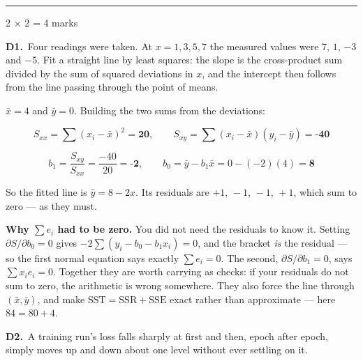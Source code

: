 \documentclass[10pt,a4paper]{article}
\newcommand{\parthead}[2]{\vspace{2pt}\noindent\rule{\linewidth}{0.4pt}\par\vspace{2pt}%
  \noindent{\bfseries Part #1}\hfill{\small #2}\par\vspace{1pt}}
\newcommand{\sol}[1]{\textbf{#1}}
\begin{document}
\newpage

\parthead{D --- Short answer}{2 $\times$ 2 = 4 marks}

\textbf{D1.}\ Four readings were taken. At $x = 1, 3, 5, 7$ the measured values were $7$, $1$, $-3$ and $-5$. Fit a straight line by least squares: the slope is the cross-product sum divided by the sum of squared deviations in $x$, and the intercept then follows from the line passing through the point of means.

\vspace{2pt}

$\bar x = 4$ and $\bar y = 0$. Building the two sums from the deviations:

\[ S_{xx} = \sum (x_i-\bar x)^2 = \sol{20}, \qquad S_{xy} = \sum (x_i-\bar x)(y_i-\bar y) = \sol{-40} \]

\[ b_1 = \frac{S_{xy}}{S_{xx}} = \frac{-40}{20} = \sol{-2}, \qquad b_0 = \bar y - b_1\bar x = 0 - (-2)(4) = \sol{8} \]

So the fitted line is $\hat y = 8 - 2 x$. Its residuals are $+1,\,-1,\,-1,\,+1$, which sum to zero --- as they must.

\vspace{2pt}

\textbf{Why $\sum e_i$ had to be zero.} You did not need the residuals to know it. Setting $\partial S/\partial b_0 = 0$ gives $-2\sum(y_i - b_0 - b_1x_i) = 0$, and the bracket \emph{is} the residual --- so the first normal equation says exactly $\sum e_i = 0$. The second, $\partial S/\partial b_1 = 0$, says $\sum x_ie_i = 0$. Together they are worth carrying as checks: if your residuals do not sum to zero, the arithmetic is wrong somewhere. They also force the line through $(\bar x, \bar y)$, and make $\mathrm{SST} = \mathrm{SSR} + \mathrm{SSE}$ exact rather than approximate --- here $84 = 80 + 4$.

\vspace{6pt}

\textbf{D2.}\ A training run's loss falls sharply at first and then, epoch after epoch, simply moves up and down about one level without ever settling on it.

\vspace{2pt}
\end{document}

